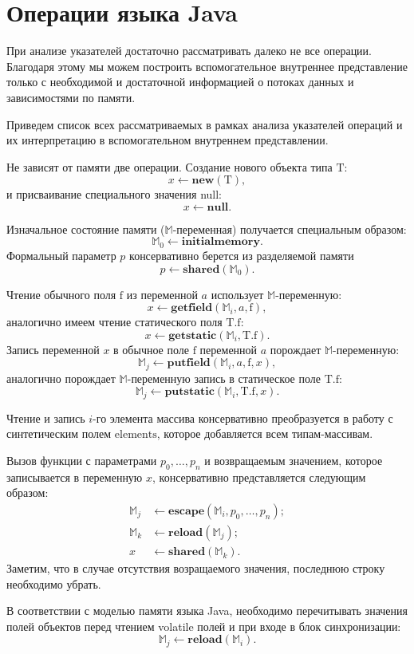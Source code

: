 \documentclass[14pt,titlepage,draft]{extarticle}
\newcommand{\M}{\ensuremath{\mathbb{M}}}
\newcommand{\Mhyp}{$\mathbb{M}$\hyp}
\newcommand{\NEW}{\textbf{new}}
\newcommand{\NULL}{\textbf{null}}
\newcommand{\INITIALMEMORY}{\textbf{initialmemory}}
\newcommand{\GETFIELD}{\textbf{getfield}}
\newcommand{\PUTFIELD}{\textbf{putfield}}
\newcommand{\GETSTATIC}{\textbf{getstatic}}
\newcommand{\PUTSTATIC}{\textbf{putstatic}}
\newcommand{\ESCAPE}{\textbf{escape}}
\newcommand{\SHARED}{\textbf{shared}}
\newcommand{\RELOAD}{\textbf{reload}}
\newcommand{\eng}[1]{{\English#1}}
\let\oldsection\section
\renewcommand{\section}{\newpage\oldsection}
\newcommand{\java}{\eng{Java}\xspace}
\begin{document}
  \section{Операции языка Java}

    При анализе указателей достаточно рассматривать далеко не все операции.
    Благодаря этому мы можем построить вспомогательное внутреннее представление
    только с необходимой и достаточной информацией о потоках данных и
    зависимостями по памяти.

    Приведем список всех рассматриваемых в рамках анализа указателей операций и
    их интерпретацию в вспомогательном внутреннем представлении.

    Не зависят от памяти две операции. Создание нового объекта типа
    $\textrm{T}$:
    \[ x \leftarrow \NEW(\textrm{T}), \]
    и присваивание специального значения null:
    \[ x \leftarrow \NULL. \]

    Изначальное состояние памяти (\Mhyp переменная) получается специальным
    образом:
    \[ \M_0 \leftarrow \INITIALMEMORY. \]
    Формальный параметр $p$ консервативно берется из разделяемой памяти
    \[ p \leftarrow \SHARED(\M_0). \]

    Чтение обычного поля $\textrm{f}$ из переменной $a$ использует
    \Mhyp переменную:
    \[ x \leftarrow \GETFIELD(\M_i, a, \textrm{f}), \]
    аналогично имеем чтение статического поля $\textrm{T.f}$:
    \[ x \leftarrow \GETSTATIC(\M_i, \textrm{T.f}). \]
    Запись переменной $x$ в обычное поле $\textrm{f}$ переменной $a$ порождает
    \Mhyp переменную:
    \[ \M_j \leftarrow \PUTFIELD(\M_i, a, \textrm{f}, x), \]
    аналогично порождает \Mhyp переменную запись в статическое поле $\textrm{T.f}$:
    \[ \M_j \leftarrow \PUTSTATIC(\M_i, \textrm{T.f}, x). \]

    Чтение и запись $i$-го элемента массива консервативно преобразуется в
    работу с синтетическим полем $\textrm{elements}$, которое добавляется всем
    типам-массивам.

    Вызов функции с параметрами $p_0, \ldots, p_n$ и возвращаемым значением,
    которое записывается в переменную $x$, консервативно представляется
    следующим образом:
    \[\begin{aligned}
      \M_j &\leftarrow \ESCAPE(\M_i, p_0, \ldots, p_n); \\
      \M_k &\leftarrow \RELOAD(\M_j); \\
      x  &\leftarrow \SHARED(\M_k).
    \end{aligned}\]
    Заметим, что в случае отсутствия возращаемого значения, последнюю строку
    необходимо убрать.

    В соответствии с моделью памяти языка \java, необходимо перечитывать
    значения полей объектов перед чтением \eng{volatile} полей и при входе в
    блок синхронизации:
    \[ \M_j \leftarrow \RELOAD(\M_i). \]


  \newpage
  
\end{document}
